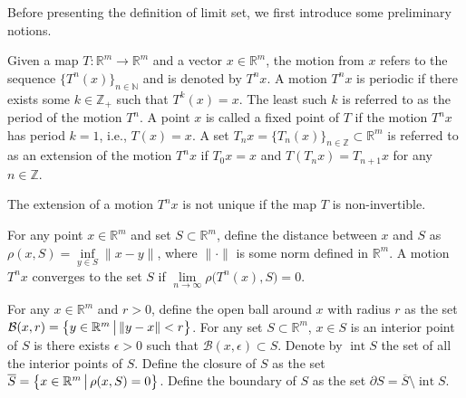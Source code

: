 \documentclass[10pt]{svmult}
\newcommand{\intr}{\operatorname{int}}
\begin{document}
Before presenting the definition of limit set, we first introduce some preliminary notions.

\begin{definition}\label{def:motion}
Given a map $T:\mathbb{R}^m \to \mathbb{R}^m$ and a vector $x\in \mathbb{R}^m$, the motion from $x$ refers to the sequence $\{T^n(x)\}_{n\in \mathbb{N}}$ and is denoted by $T^n x$. A motion $T^n x$ is periodic if there exists some $k\in \mathbb{Z}_+$ such that $T^k(x)=x$. The least such $k$ is referred to as the period of the motion $T^n$. A point $x$ is called a fixed point of $T$ if the motion $T^n x$ has period $k=1$, i.e., $T(x)=x$. A set $T_n x = \{T_n(x)\}_{n\in \mathbb{Z}}\subset \mathbb{R}^m$ is referred to as an extension of the motion $T^n x$ if $T_0 x = x$ and $T(T_n x) = T_{n+1} x$ for any $n\in \mathbb{Z}$.
\end{definition}


\begin{remark}
The extension of a motion $T^n x$ is not unique if the map $T$ is non-invertible.
\end{remark}


\begin{definition}\label{def:dist-conv}
For any point $x\in \mathbb{R}^m$ and set $S\subset \mathbb{R}^m$, define the distance between $x$ and $S$ as $\rho(x,S)=\inf\limits_{y\in S} \lVert x-y \rVert$, where $\lVert \cdot \rVert$ is some norm defined in $\mathbb{R}^m$. A motion $T^n x$ converges to the set $S$ if $\lim\limits_{n\to \infty} \rho\big( T^n(x),S \big)=0$.
\end{definition}


\begin{definition}\label{def:int-cls-bdr}
For any $x\in \mathbb{R}^m$ and $r>0$, define the open ball around $x$ with radius $r$ as the set $\mathcal{B}(x,r) = \big{\{} y\in \mathbb{R}^m \,\big|\, \lVert y-x \rVert <r \big{\}}$.
For any set $S\subset \mathbb{R}^m$, $x\in S$ is an interior point of $S$ is there exists $\epsilon>0$ such that $\mathcal{B}(x,\epsilon)\subset S$. Denote by $\intr{S}$ the set of all the interior points of $S$. Define the closure of $S$ as the set $\overline{S} = \big{\{} x\in \mathbb{R}^m \,\big|\, \rho(x,S)=0 \big{\}}$. Define the boundary of $S$ as the set $\partial S = \overline{S}\setminus \intr{S}$.
\end{definition}
\end{document}
